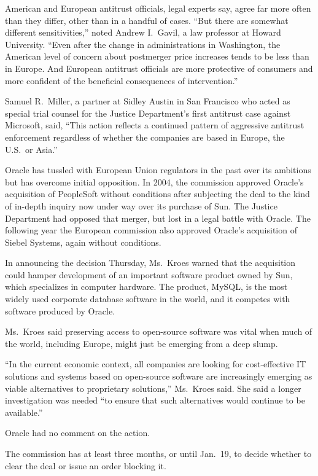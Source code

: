 ﻿\documentclass[12pt]{article}
\begin{document}
American and European antitrust officials, legal experts say, agree far more often than they differ,
other than in a handful of cases. ``But there are somewhat different sensitivities,'' noted Andrew
I.~Gavil, a law professor at Howard University. ``Even after the change in administrations in
Washington, the American level of concern about postmerger price increases tends to be less than in
Europe. And European antitrust officials are more protective of consumers and more confident of the
beneficial consequences of intervention.''

Samuel R.~Miller, a partner at Sidley Austin in San Francisco who acted as special trial counsel for
the Justice Department's first antitrust case against Microsoft, said, ``This action reflects a
continued pattern of aggressive antitrust enforcement regardless of whether the companies are based
in Europe, the U.S.~or Asia.''

Oracle has tussled with European Union regulators in the past over its ambitions but has overcome
initial opposition. In 2004, the commission approved Oracle's acquisition of PeopleSoft without
conditions after subjecting the deal to the kind of in-depth inquiry now under way over its purchase
of Sun. The Justice Department had opposed that merger, but lost in a legal battle with Oracle. The
following year the European commission also approved Oracle's acquisition of Siebel Systems, again
without conditions.

In announcing the decision Thursday, Ms.~Kroes warned that the acquisition could hamper development
of an important software product owned by Sun, which specializes in computer hardware. The product,
MySQL, is the most widely used corporate database software in the world, and it competes with
software produced by Oracle.

Ms.~Kroes said preserving access to open-source software was vital when much of the world, including
Europe, might just be emerging from a deep slump.

``In the current economic context, all companies are looking for cost-effective IT solutions and
systems based on open-source software are increasingly emerging as viable alternatives to
proprietary solutions,'' Ms.~Kroes said. She said a longer investigation was needed ``to ensure that
such alternatives would continue to be available.''

Oracle had no comment on the action.

The commission has at least three months, or until Jan.~19, to decide whether to clear the deal or
issue an order blocking it.
\end{document}
